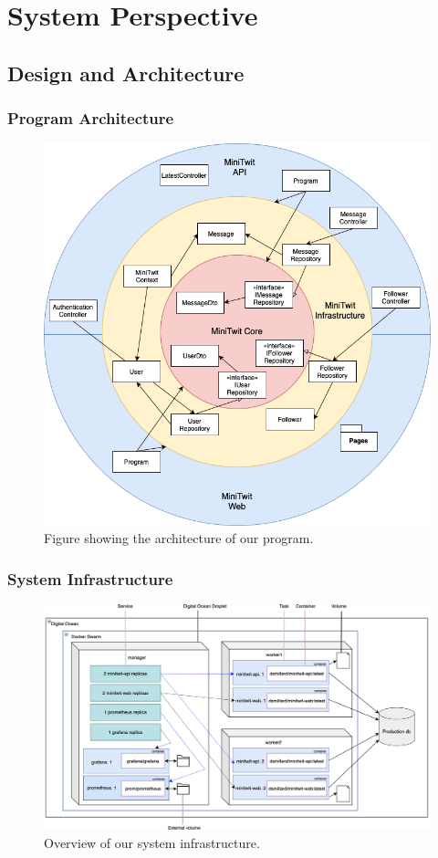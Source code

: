 \section{System Perspective}
\subsection{Design and Architecture}
\subsubsection*{Program Architecture}
\begin{figure}[H]
  \centering
  \includegraphics[width=0.75\linewidth]{Images/onion_architecture.png}
  \caption{Figure showing the architecture of our program.}
    \label{fig:onion}
\end{figure}

\subsubsection*{System Infrastructure}
\begin{figure}[H]
  \centering
  \includegraphics[width=\textwidth]{Images/docker_swarm.png}
  \caption{Overview of our system infrastructure.}
  \label{fig:dashboard}
\end{figure}

